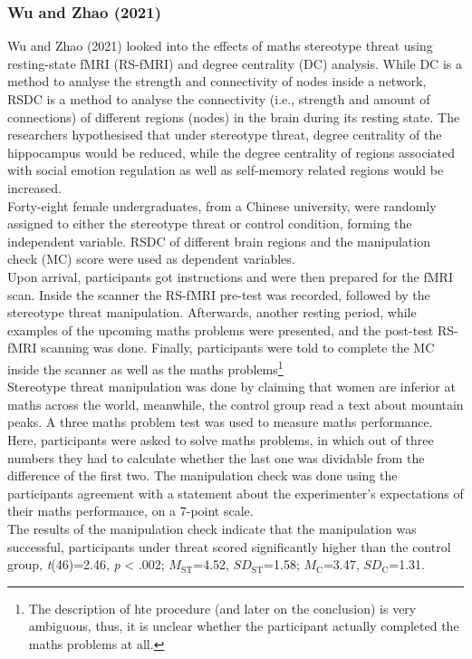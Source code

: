 \documentclass[
  stu,floatsintext]{apa7}
\begin{document}
\subsubsection{Wu and Zhao (2021)}\label{wudegreecentralitybrain2021}

Wu and Zhao (2021) looked into the effects of maths stereotype threat using resting-state fMRI (RS-fMRI) and degree centrality (DC) analysis.
While DC is a method to analyse the strength and connectivity of nodes inside a network, RSDC is a method to analyse the connectivity (i.e., strength and amount of connections) of different regions (nodes) in the brain during its resting state.
The researchers hypothesised that under stereotype threat, degree centrality of the hippocampus would be reduced, while the degree centrality of regions associated with social emotion regulation as well as self-memory related regions would be increased.\\
Forty-eight female undergraduates, from a Chinese university, were randomly assigned to either the stereotype threat or control condition, forming the independent variable.
RSDC of different brain regions and the manipulation check (MC) score were used as dependent variables.\\
Upon arrival, participants got instructions and were then prepared for the fMRI scan.
Inside the scanner the RS-fMRI pre-test was recorded, followed by the stereotype threat manipulation.
Afterwards, another resting period, while examples of the upcoming maths problems were presented, and the post-test RS-fMRI scanning was done.
Finally, participants were told to complete the MC inside the scanner as well as the maths problems\footnote{The description of hte procedure (and later on the conclusion) is very ambiguous, thus, it is unclear whether the participant actually completed the maths problems at all.}\\
Stereotype threat manipulation was done by claiming that women are inferior at maths across the world, meanwhile, the control group read a text about mountain peaks.
A three maths problem test was used to measure maths performance.
Here, participants were asked to solve maths problems, in which out of three numbers they had to calculate whether the last one was dividable from the difference of the first two.
The manipulation check was done using the participants agreement with a statement about the experimenter's expectations of their maths performance, on a 7-point scale.\\
The results of the manipulation check indicate that the manipulation was successful, participants under threat scored significantly higher than the control group, \emph{t}(46)=2.46, \emph{p} \textless{} .002; \(M_{\text{ST}}\)=4.52, \(SD_{\text{ST}}\)=1.58; \(M_{\text{C}}\)=3.47, \(SD_{\text{C}}\)=1.31.
\end{document}
